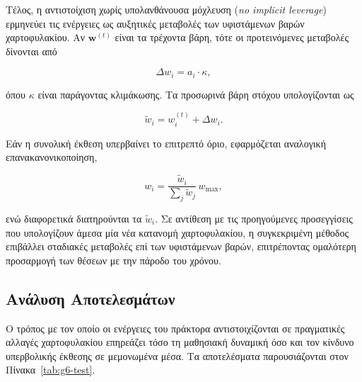 Τέλος, η αντιστοίχιση χωρίς υπολανθάνουσα μόχλευση (\textit{no implicit leverage}) ερμηνεύει τις ενέργειες ως αυξητικές μεταβολές των υφιστάμενων βαρών χαρτοφυλακίου. Αν $\mathbf{w}^{(t)}$ είναι τα τρέχοντα βάρη, τότε οι προτεινόμενες μεταβολές δίνονται από

\begin{equation}
\Delta w_i = a_i \cdot \kappa,
\end{equation}

όπου $\kappa$ είναι παράγοντας κλιμάκωσης. Τα προσωρινά βάρη στόχου υπολογίζονται ως

\begin{equation}
\tilde{w}_i = w_i^{(t)} + \Delta w_i.
\end{equation}

Εάν η συνολική έκθεση υπερβαίνει το επιτρεπτό όριο, εφαρμόζεται αναλογική επανακανονικοποίηση,

\begin{equation}
w_i=
\frac{\tilde{w}_i}
{\sum_j \tilde{w}_j}
\,w_{\max},
\end{equation}

ενώ διαφορετικά διατηρούνται τα $\tilde{w}_i$. Σε αντίθεση με τις προηγούμενες προσεγγίσεις που υπολογίζουν άμεσα μία νέα κατανομή χαρτοφυλακίου, η συγκεκριμένη μέθοδος επιβάλλει σταδιακές μεταβολές επί των υφιστάμενων βαρών, επιτρέποντας ομαλότερη προσαρμογή των θέσεων με την πάροδο του χρόνου.


\subsection{Ανάλυση Αποτελεσμάτων}
\label{subsec:exp-actions-results}

Ο τρόπος με τον οποίο οι ενέργειες του πράκτορα αντιστοιχίζονται σε πραγματικές αλλαγές χαρτοφυλακίου επηρεάζει τόσο τη μαθησιακή 
δυναμική όσο και τον κίνδυνο υπερβολικής έκθεσης σε μεμονωμένα μέσα. Τα αποτελέσματα παρουσιάζονται στον Πίνακα~\ref{tab:g6-test}.

